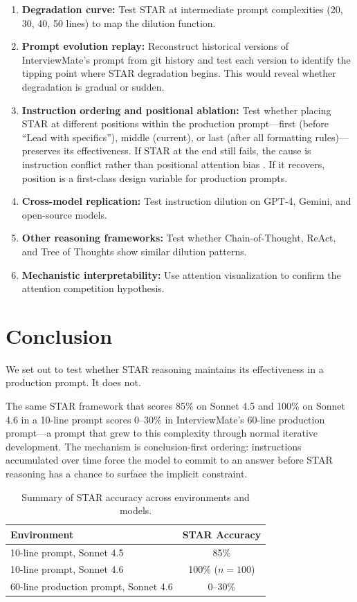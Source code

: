 \documentclass[11pt]{article}
\begin{document}
\begin{enumerate}[leftmargin=2em]
\item \textbf{Degradation curve:} Test STAR at intermediate prompt complexities (20, 30, 40, 50 lines) to map the dilution function.
\item \textbf{Prompt evolution replay:} Reconstruct historical versions of InterviewMate's prompt from git history and test each version to identify the tipping point where STAR degradation begins. This would reveal whether degradation is gradual or sudden.
\item \textbf{Instruction ordering and positional ablation:} Test whether placing STAR at different positions within the production prompt---first (before ``Lead with specifics''), middle (current), or last (after all formatting rules)---preserves its effectiveness. If STAR at the end still fails, the cause is instruction conflict rather than positional attention bias \citep{liu2024}. If it recovers, position is a first-class design variable for production prompts.
\item \textbf{Cross-model replication:} Test instruction dilution on GPT-4, Gemini, and open-source models.
\item \textbf{Other reasoning frameworks:} Test whether Chain-of-Thought, ReAct, and Tree of Thoughts show similar dilution patterns.
\item \textbf{Mechanistic interpretability:} Use attention visualization to confirm the attention competition hypothesis.
\end{enumerate}

\section{Conclusion}

We set out to test whether STAR reasoning maintains its effectiveness in a production prompt. It does not.

The same STAR framework that scores 85\% on Sonnet 4.5 and 100\% on Sonnet 4.6 in a 10-line prompt scores 0--30\% in InterviewMate's 60-line production prompt---a prompt that grew to this complexity through normal iterative development. The mechanism is conclusion-first ordering: instructions accumulated over time force the model to commit to an answer before STAR reasoning has a chance to surface the implicit constraint.

\begin{table}[H]
\centering
\begin{tabular}{lc}
\toprule
\textbf{Environment} & \textbf{STAR Accuracy} \\
\midrule
10-line prompt, Sonnet 4.5 & 85\% \\
10-line prompt, Sonnet 4.6 & 100\% ($n=100$) \\
60-line production prompt, Sonnet 4.6 & 0--30\% \\
\bottomrule
\end{tabular}
\caption{Summary of STAR accuracy across environments and models.}
\label{tab:summary}
\end{table}
\end{document}
